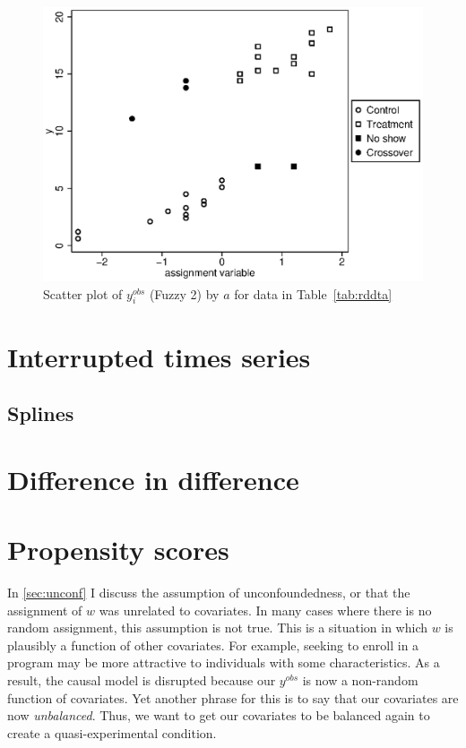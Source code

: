 \begin{figure}
   \centering
   \includegraphics[angle=0,
           width=.75\textwidth]{rd_t2.eps}
   \caption{Scatter plot of $y_i^{obs}$ (Fuzzy 2) by $a$ for data in Table~\ref{tab:rddta}}
  \label{fig:rd_t2}
\end{figure}


\section{Interrupted times series}

\subsection{Splines}

\section{Difference in difference}

\section{Propensity scores}

In \ref{sec:unconf} I discuss the assumption of unconfoundedness, or that the assignment of $w$ was unrelated to covariates. In many cases where there is no random assignment, this assumption is not true. This is a situation in which $w$ is plausibly a function of other covariates. For example, seeking to enroll in a program may be more attractive to individuals with some characteristics. As a result, the causal model is disrupted because our $y^{obs}$ is now a non-random function of covariates. Yet another phrase for this is to say that our covariates are now {\it unbalanced}. Thus, we want to get our covariates to be balanced again to create a quasi-experimental condition.

